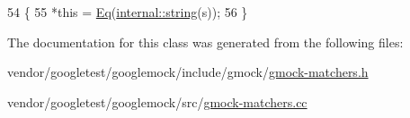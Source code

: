 \begin{DoxyCode}
54                                                      \{
55   *\textcolor{keyword}{this} = \hyperlink{namespacetesting_a0cb8ba7eae844c871eccb29e7c81635f}{Eq}(\hyperlink{namespacetesting_1_1internal_a8e8ff5b11e64078831112677156cb111}{internal::string}(s));
56 \}
\end{DoxyCode}


The documentation for this class was generated from the following files\+:\begin{DoxyCompactItemize}
\item 
vendor/googletest/googlemock/include/gmock/\hyperlink{gmock-matchers_8h}{gmock-\/matchers.\+h}\item 
vendor/googletest/googlemock/src/\hyperlink{gmock-matchers_8cc}{gmock-\/matchers.\+cc}\end{DoxyCompactItemize}
